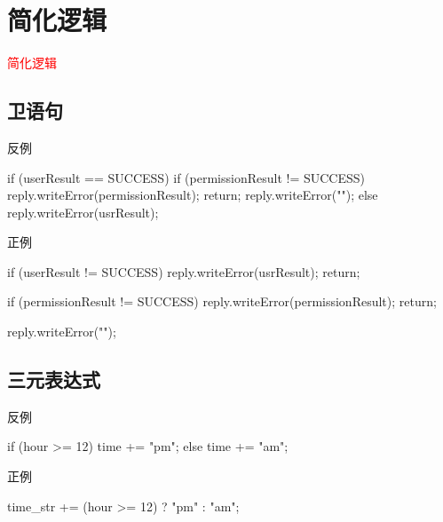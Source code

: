 \section{简化逻辑}
\label{sec:simple-logic}

\begin{frame}
  \begin{center}
    \Huge{\textcolor{red}{简化逻辑}}
  \end{center}
\end{frame}

\subsection{卫语句}

\begin{frame}[fragile]{反例}
  \begin{c++}
if (userResult == SUCCESS) {
  if (permissionResult != SUCCESS) {
    reply.writeError(permissionResult);
    return;
  }
  reply.writeError("");
} else {
  reply.writeError(usrResult);
}
  \end{c++}
\end{frame}

\begin{frame}[fragile]{正例}
  \begin{c++}
if (userResult != SUCCESS) {
  reply.writeError(usrResult);
  return;
}

if (permissionResult != SUCCESS) {
  reply.writeError(permissionResult);
  return;
}

reply.writeError("");
  \end{c++}
\end{frame}

\subsection{三元表达式}

\begin{frame}[fragile]{反例}
  \begin{c++}
if (hour >= 12)  {
  time += "pm";
} else {
  time += "am";
}
  \end{c++}
\end{frame}

\begin{frame}[fragile]{正例}
  \begin{c++}
time_str += (hour >= 12) ? "pm" : "am";
  \end{c++}
\end{frame}

